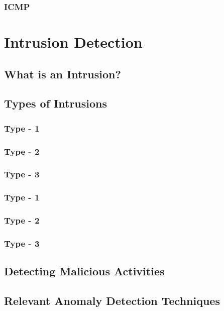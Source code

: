 \documentclass[12pt]{article}
\begin{document}
			\subsubsection{ICMP}
			\lipsum[2]
	\cleardoublepage
	\section{Intrusion Detection}\label{sec:i-detection}
	\lipsum[1-2]
		\subsection{What is an Intrusion?}
		\lipsum[1-2]
		
		\subsection{Types of Intrusions}
		\lipsum[1]
			\subsubsection{Type - 1}
			\lipsum[1-2]
			\subsubsection{Type - 2}
			\lipsum[1-2]
			\subsubsection{Type - 3}
			\lipsum[1-2]
			\subsubsection{Type - 1}
			\lipsum[1-2]
			\subsubsection{Type - 2}
			\lipsum[1-2]
			\subsubsection{Type - 3}
			\lipsum[1-2]		
		\subsection{Detecting Malicious Activities}
		\lipsum[1-2]
		
		\subsection{Relevant Anomaly Detection Techniques}
		\lipsum[1-2]
\end{document}
